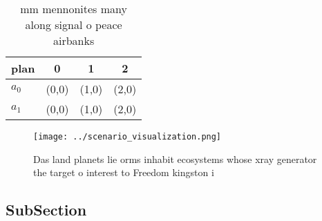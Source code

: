 \documentclass[a4paper]{article}
\begin{document}
\begin{table}
\begin{adjustbox}{width=0.6\columnwidth}
\begin{tabular}{|l|l|l|l|}
\hline
\textbf{plan} & \multicolumn{1}{c|}{\textbf{0}} & \multicolumn{1}{c|}{\textbf{1}} & \multicolumn{1}{c|}{\textbf{2}} \\ \hline
\textbf{$a_0$}  & (0,0) & (1,0) & (2,0) \\ \hline
\textbf{$a_1$}  & (0,0) & (1,0) & (2,0) \\ \hline
\end{tabular}
\end{adjustbox}
\caption{ mm mennonites many along signal o peace airbanks
}
\end{table}

\begin{figure}
\centering
\texttt{[image: ../scenario\_visualization.png]}
\caption{Das land planets lie orms inhabit ecosystems whose xray generator the target o interest to Freedom kingston i
}
\end{figure}
 
\subsection{SubSection}
\end{document}
